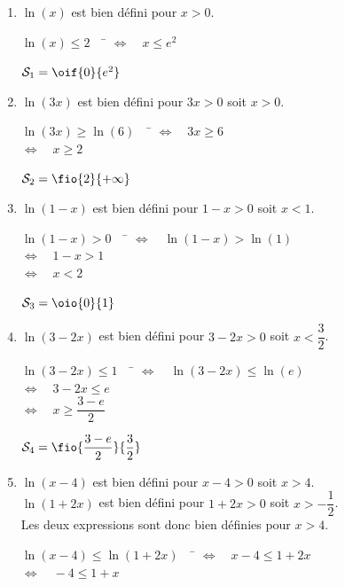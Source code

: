 \documentclass[a4paper,11pt,exos]{nsi} %
\begin{document}
\textcolor{UGLiBlue}{
        \begin{enumerate}
            \item $\ln(x)$ est bien défini pour $x>0$.
            \begin{tabbing}
                $\ln(x)\leqslant 2\quad$ \= $\iff \quad x\leqslant e^2$
            \end{tabbing}
            $\mathcal{S}_1=\oif{0}{e^2}$
            \item $\ln(3x)$ est bien défini pour $3x>0$ soit $x>0$.
            \begin{tabbing}
                $\ln(3x)\geqslant \ln(6)\quad$ \= $\iff \quad 3x\geqslant 6$\\
                \> $\iff \quad x\geqslant 2$
            \end{tabbing}
            $\mathcal{S}_2=\fio{2}{+\infty}$
            \item $\ln(1-x)$ est bien défini pour $1-x>0$ soit $x<1$.
            \begin{tabbing}
                $\ln(1-x)> 0\quad$ \= $\iff \quad \ln(1-x)>\ln(1)$\\
                \> $\iff \quad 1-x>1$\\
                \> $\iff \quad x<2$
            \end{tabbing}
            $\mathcal{S}_3=\oio{0}{1}$
            \item $\ln(3-2x)$ est bien défini pour $3-2x>0$ soit $x<\dfrac{3}{2}$.
            \begin{tabbing}
                $\ln(3-2x)\leqslant 1\quad$ \= $\iff \quad \ln(3-2x)\leqslant \ln(e)$\\
                \> $\iff \quad 3-2x\leqslant e$\\
                \> $\iff \quad x\geqslant \dfrac{3-e}{2}$
            \end{tabbing}
            $\mathcal{S}_4=\fio{\dfrac{3-e}{2}}{\dfrac{3}{2}}$
            \item $\ln(x-4)$ est bien défini pour $x-4>0$ soit $x>4$.\\
            $\ln(1+2x)$ est bien défini pour $1+2x>0$ soit $x>-\dfrac{1}{2}$.\\
            Les deux expressions sont donc bien définies pour $x>4$.
            \begin{tabbing}
                $\ln(x-4)\leqslant \ln(1+2x)\quad$ \= $\iff \quad x-4\leqslant 1+2x$\\
                \> $\iff \quad -4\leqslant 1+x$\\

\end{tabbing}
\end{enumerate}}
\end{document}
